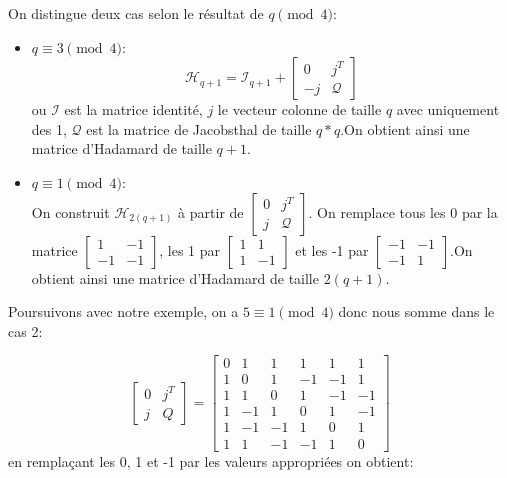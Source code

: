 \documentclass{article}
\begin{document}
On distingue deux cas selon le résultat de $q \pmod 4$:
\begin{itemize}
	\item $q \equiv 3 \pmod{4}:$
		\begin{equation*}
			\mathcal{H}_{q+1} = \mathcal{I}_{q+1} + 
			\begin{bmatrix}
				0 & j^T\\
				-j & \mathcal{Q}
			\end{bmatrix}
		\end{equation*}
		ou $\mathcal{I}$ est la matrice identité, $j$ le vecteur colonne de taille $q$
		avec uniquement des 1, $\mathcal{Q}$ est la matrice de Jacobsthal de taille 
		$q*q$.On obtient ainsi une matrice d'Hadamard de 
		taille $q+1$.
	\item $q \equiv 1 \pmod{4}:$\\
		On construit $\mathcal{H}_{2(q+1)}$ à partir de 
		$\begin{bmatrix}
			0 & j^T\\
			j & \mathcal{Q}
		\end{bmatrix}$.
		On remplace tous les 0 par la matrice
		$\begin{bmatrix}
			1 & -1\\
			-1 & -1
		\end{bmatrix}$,
		les 1 par 	
		$\begin{bmatrix}
			1 & 1\\
			1 & -1
		\end{bmatrix}$ 
		et les -1 par 
		$\begin{bmatrix}
			-1 & -1\\
			-1 & 1
		\end{bmatrix}$.On obtient ainsi une matrice d'Hadamard de taille 
		$2(q+1)$.
\end{itemize}

Poursuivons avec notre exemple, on a $5 \equiv 1 \pmod{4}$ donc nous somme
dans le cas 2:

\begin{equation*}
	\begin{bmatrix}
		0 & j^T\\
		j & Q
	\end{bmatrix}
	=
	\begin{bmatrix}
		0 & 1 & 1 & 1 & 1 & 1\\
		1 & 0 & 1 & -1 & -1 & 1\\
		1 & 1 & 0 & 1 & -1 & -1\\
		1 & -1 & 1 & 0 & 1 & -1\\
		1 & -1 & -1 & 1 & 0 & 1\\
		1 & 1 & -1 & -1 & 1 & 0
	\end{bmatrix}
\end{equation*}
en remplaçant les 0, 1 et -1 par les valeurs appropriées on obtient:
\end{document}
